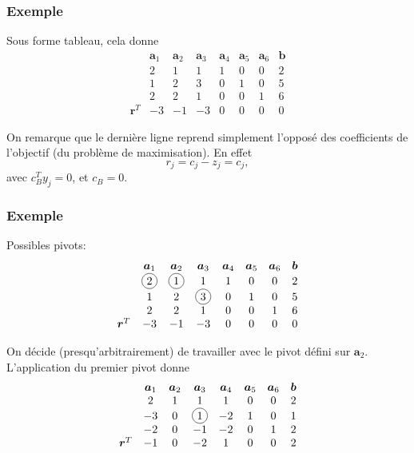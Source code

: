 \documentclass[t,usepdftitle=false]{beamer}
\newcommand*\circled[1]{\tikz[baseline=(char.base)]{
    \node[shape=circle,draw,inner sep=2pt] (char) {#1};}}
\def\ba{\boldsymbol{a}}
\def\bb{\boldsymbol{b}}
\def\br{\boldsymbol{r}}
\begin{document}
\begin{frame}
\frametitle{Exemple}

Sous forme tableau, cela donne
\[
\begin{matrix}
& \ba_1 & \ba_2 & \ba_3 & \ba_4 & \ba_5 &\ba_6 & \bb \\
& 2 & 1 & 1 & 1 & 0 & 0 & 2 \\
& 1 & 2 & 3 & 0 & 1 & 0 & 5 \\
& 2 & 2 & 1 & 0 & 0 & 1 & 6 \\
\br^T & -3 & -1 & -3 & 0 & 0 & 0 & 0
\end{matrix}
\]

On remarque que le dernière ligne reprend simplement l'opposé des coefficients de l'objectif (du problème de maximisation). En effet
$$
r_j = c_j - z_j = c_j,
$$
avec $c_B^Ty_j = 0$, et $c_B = 0$.

\end{frame}

\begin{frame}
\frametitle{Exemple}

Possibles pivots:
\[
\begin{matrix}
& \ba_1 & \ba_2 & \ba_3 & \ba_4 & \ba_5 &\ba_6 & \bb \\
& \circled{2} & \circled{1} & 1 & 1 & 0 & 0 & 2 \\
& 1 & 2 & \circled{3} & 0 & 1 & 0 & 5 \\
& 2 & 2 & 1 & 0 & 0 & 1 & 6 \\
\br^T & -3 & -1 & -3 & 0 & 0 & 0 & 0
\end{matrix}
\]

\mbox{}

On décide (presqu'arbitrairement) de travailler avec le pivot défini sur $\ba_2$. L'application du premier pivot donne
\[
\begin{matrix}
& \ba_1 & \ba_2 & \ba_3 & \ba_4 & \ba_5 &\ba_6 & \bb \\
& 2 & 1 & 1 & 1 & 0 & 0 & 2 \\
& -3 & 0 & \circled{1} & -2 & 1 & 0 & 1 \\
& -2 & 0 & -1 & -2 & 0 & 1 & 2 \\
\br^T & -1 & 0 & -2 & 1 & 0 & 0 & 2
\end{matrix}
\]

\end{frame}
\end{document}
